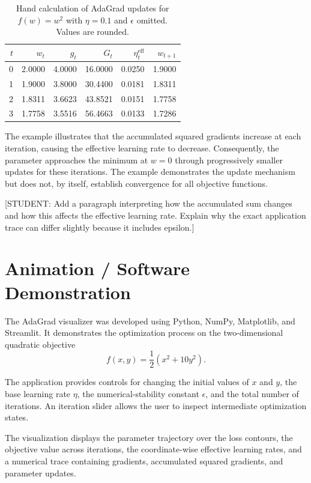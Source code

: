 \documentclass[11pt,a4paper]{article}
\begin{document}
\begin{table}[htbp]
\centering
\small
\begin{tabular}{@{}rrrrrr@{}}
\toprule
$t$ & $w_t$ & $g_t$ & $G_t$ &
$\eta_t^{\mathrm{eff}}$ & $w_{t+1}$ \\
\midrule
0 & 2.0000 & 4.0000 & 16.0000 & 0.0250 & 1.9000 \\
1 & 1.9000 & 3.8000 & 30.4400 & 0.0181 & 1.8311 \\
2 & 1.8311 & 3.6623 & 43.8521 & 0.0151 & 1.7758 \\
3 & 1.7758 & 3.5516 & 56.4663 & 0.0133 & 1.7286 \\
\bottomrule
\end{tabular}
\caption{Hand calculation of AdaGrad updates for $f(w)=w^2$
with $\eta=0.1$ and $\epsilon$ omitted. Values are rounded.}
\label{tab:adagrad-worked}
\end{table}

The example illustrates that the accumulated squared gradients
increase at each iteration, causing the effective learning rate
to decrease. Consequently, the parameter approaches the minimum
at $w=0$ through progressively smaller updates for these
iterations. The example demonstrates the update mechanism but
does not, by itself, establish convergence for all objective
functions.


[STUDENT: Add a paragraph interpreting how the accumulated sum changes and
how this affects the effective learning rate. Explain why the exact application
trace can differ slightly because it includes epsilon.]

\section{Animation / Software Demonstration}

The AdaGrad visualizer was developed using Python, NumPy,
Matplotlib, and Streamlit. It demonstrates the optimization
process on the two-dimensional quadratic objective
\[
f(x,y)=\frac{1}{2}(x^2+10y^2).
\]

The application provides controls for changing the initial
values of $x$ and $y$, the base learning rate $\eta$,
the numerical-stability constant $\epsilon$, and the total
number of iterations. An iteration slider allows the user
to inspect intermediate optimization states.

The visualization displays the parameter trajectory over
the loss contours, the objective value across iterations,
the coordinate-wise effective learning rates, and a
numerical trace containing gradients, accumulated squared
gradients, and parameter updates.
\end{document}
